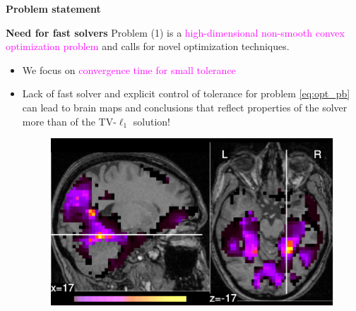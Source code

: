 \documentclass[french]{STIC_poster}
\begin{document}
\begin{frame}[t]
\begin{columns}[t]
\begin{column}{.48\linewidth}
\begin{abox}{\textbf{Problem statement}}
				\begin{nbox}[\textwidth]{\textbf{Need for fast solvers}}
                                  Problem (1) is a \textcolor{magenta}{high-dimensional non-smooth convex optimization problem} and calls for novel optimization techniques. %
                                  \begin{itemize}
                                    \item We focus on \textcolor{magenta}{convergence time for small tolerance}
                                  \item Lack of fast solver and explicit control of
                                    tolerance for problem \eqref{eq:opt_pb} can lead to brain maps and conclusions that reflect
                                    properties of the solver more than of the TV-$\ell_{1}$ solution!
                                  \begin{figure}
                                    \includegraphics[width=.32\linewidth]{maps/face_vs_house_tol_0_1.pdf}%
                                    \llap{\color{green}\raisebox{.161\linewidth}{\rlap{\sffamily %
}}}
\end{figure}
\end{itemize}
\end{nbox}
\end{abox}
\end{column}
\end{columns}
\end{frame}
\end{document}
